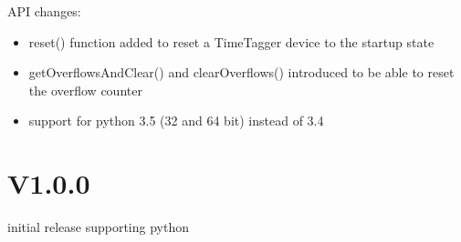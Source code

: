 \documentclass[letterpaper,10pt,english]{sphinxmanual}
\begin{document}
API changes:
\begin{itemize}
\item {} 
reset() function added to reset a TimeTagger device to the startup state

\item {} 
getOverflowsAndClear() and clearOverflows() introduced to be able to reset the overflow counter

\item {} 
support for python 3.5 (32 and 64 bit) instead of 3.4

\end{itemize}


\section{V1.0.0}
\label{sections/changelog:v1-0-0}
initial release supporting python



\renewcommand{\indexname}{Index}
\printindex
\end{document}
